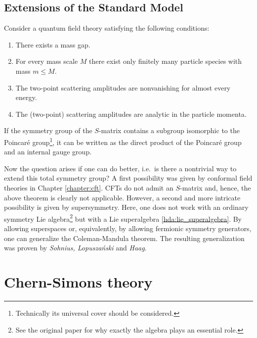 \subsection{Extensions of the Standard Model}

    \begin{theorem}
        Consider a quantum field theory satisfying the following conditions:
        \begin{enumerate}
            \item There exists a mass gap.
            \item For every mass scale $M$ there exist only finitely many particle species with mass $m\leq M$.
            \item The two-point scattering amplitudes are nonvanishing for almost every energy.
            \item The (two-point) scattering amplitudes are analytic in the particle momenta.
        \end{enumerate}
        If the symmetry group of the $S$-matrix contains a subgroup isomorphic to the Poincar\'e group\footnote{Technically its universal cover should be considered.}, it can be written as the direct product of the Poincar\'e group and an internal gauge group.
    \end{theorem}

    Now the question arises if one can do better, i.e.~is there a nontrivial way to extend this total symmetry group? A first possibility was given by conformal field theories in Chapter \ref{chapter:cft}. CFTs do not admit an $S$-matrix and, hence, the above theorem is clearly not applicable. However, a second and more intricate possibility is given by supersymmetry. Here, one does not work with an ordinary symmetry Lie algebra\footnote{See the original paper \cite{coleman_mandula} for why exactly the algebra plays an essential role.} but with a Lie superalgebra \ref{hda:lie_superalgebra}. By allowing superspaces or, equivalently, by allowing fermionic symmetry generators, one can generalize the Coleman-Mandula theorem. The resulting generalization was proven by \textit{Sohnius, Lopusza\'nski} and \textit{Haag}.

\section{Chern-Simons theory}

